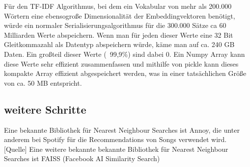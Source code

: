 Für den TF-IDF Algorithmus, bei dem ein Vokabular von mehr als 200.000 Wörtern eine ebensogroße Dimensionalität der Embeddingvektoren benötigt, würde ein normaler Serialisierungsalgorithmus für die 300.000 Sätze ca 60 Milliarden Werte abspeichern.
Wenn man für jeden dieser Werte eine 32 Bit Gleitkommazahl als Datentyp abspeichern würde, käme man auf ca. 240 GB Daten. 
Ein großteil dieser Werte (~99,9\%) sind dabei 0.
Ein Numpy Array kann diese Werte sehr effizient zusammenfassen und mithilfe von pickle kann dieses kompakte Array effizient abgespeichert werden, was in einer tatsächlichen Größe von ca. 50 MB entspricht.

\subsection{weitere Schritte}


Eine bekannte Bibliothek für Nearest Neighbour Searches ist Annoy, die unter anderem bei Spotify für die Recommendations von Songs verwendet wird. [Quelle]
Eine weitere bekannte bekannte Bibliothek für Nearest Neighbour Searches ist FAISS (Facebook AI Similarity Search)

